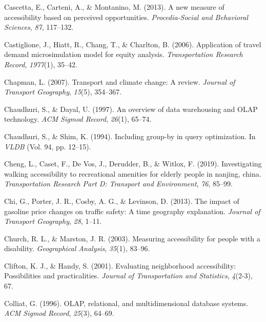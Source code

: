 \documentclass[
11pt, %
oneside, %
english, %
singlespacing, %
]{macthesis} %
\newlength{\cslhangindent}
\newenvironment{CSLReferences}[2] %
 {%
  \setlength{\parindent}{0pt}
  \ifodd #1 \everypar{\setlength{\hangindent}{\cslhangindent}}\ignorespaces\fi
  \ifnum #2 > 0
  \setlength{\parskip}{#2\baselineskip}
  \fi
 }%
 {}
\begin{document}
\begin{CSLReferences}{1}{0}
\leavevmode{}%
Cascetta, E., Carteni, A., \& Montanino, M. (2013). A new measure of accessibility based on perceived opportunities. \emph{Procedia-Social and Behavioral Sciences}, \emph{87}, 117--132.

\leavevmode{}%
Castiglione, J., Hiatt, R., Chang, T., \& Charlton, B. (2006). Application of travel demand microsimulation model for equity analysis. \emph{Transportation Research Record}, \emph{1977}(1), 35--42.

\leavevmode{}%
Chapman, L. (2007). Transport and climate change: A review. \emph{Journal of Transport Geography}, \emph{15}(5), 354--367.

\leavevmode{}%
Chaudhuri, S., \& Dayal, U. (1997). An overview of data warehousing and OLAP technology. \emph{ACM Sigmod Record}, \emph{26}(1), 65--74.

\leavevmode{}%
Chaudhuri, S., \& Shim, K. (1994). Including group-by in query optimization. In \emph{VLDB} (Vol. 94, pp. 12--15).

\leavevmode{}%
Cheng, L., Caset, F., De Vos, J., Derudder, B., \& Witlox, F. (2019). Investigating walking accessibility to recreational amenities for elderly people in nanjing, china. \emph{Transportation Research Part D: Transport and Environment}, \emph{76}, 85--99.

\leavevmode{}%
Chi, G., Porter, J. R., Cosby, A. G., \& Levinson, D. (2013). The impact of gasoline price changes on traffic safety: A time geography explanation. \emph{Journal of Transport Geography}, \emph{28}, 1--11.

\leavevmode{}%
Church, R. L., \& Marston, J. R. (2003). Measuring accessibility for people with a disability. \emph{Geographical Analysis}, \emph{35}(1), 83--96.

\leavevmode{}%
Clifton, K. J., \& Handy, S. (2001). Evaluating neighborhood accessibility: Possibilities and practicalities. \emph{Journal of Transportation and Statistics}, \emph{4}(2-3), 67.

\leavevmode{}%
Colliat, G. (1996). OLAP, relational, and multidimensional database systems. \emph{ACM Sigmod Record}, \emph{25}(3), 64--69.


\end{CSLReferences}
\end{document}
